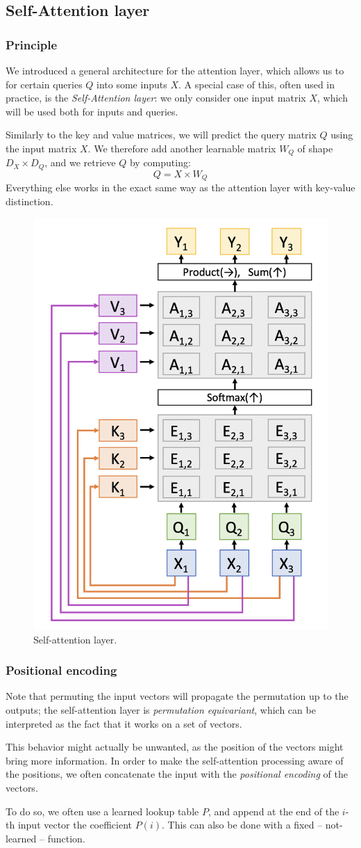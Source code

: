 \subsection{Self-Attention layer}
\subsubsection{Principle}
We introduced a general architecture for the attention layer, which allows us to  for certain queries $Q$ into some inputs $X$. A special case of this, often used in practice, is the \emph{Self-Attention layer}: we only consider one input matrix $X$, which will be used both for inputs and queries.

Similarly to the key and value matrices, we will predict the query matrix $Q$ using the input matrix $X$. We therefore add another learnable matrix $W_Q$ of shape $D_X\times D_Q$, and we retrieve $Q$ by computing:
\begin{equation*}
    Q = X\times W_Q
\end{equation*}
Everything else works in the exact same way as the attention layer with key-value distinction.

\begin{figure}[H]
    \centering
    \includegraphics[width=.35\textwidth]{images/self-attention-layer.png}
    \caption{Self-attention layer.}
\end{figure}

\subsubsection{Positional encoding}
Note that permuting the input vectors will propagate the permutation up to the outputs; the self-attention layer is \emph{permutation equivariant}, which can be interpreted as the fact that it works on a set of vectors. 

This behavior might actually be unwanted, as the position of the vectors might bring more information. In order to make the self-attention processing aware of the positions, we often concatenate the input with the \emph{positional encoding} of the vectors.

To do so, we often use a learned lookup table $P$, and append at the end of the $i$-th input vector the coefficient $P(i)$. This can also be done with a fixed -- not-learned -- function.

\newpage